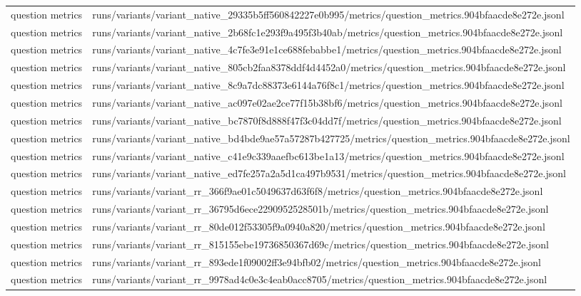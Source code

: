 \begin{tabular}{ll}
question metrics & runs/variants/variant_native_29335b5ff560842227e0b995/metrics/question_metrics.904bfaacde8e272e.jsonl \\
question metrics & runs/variants/variant_native_2b68fc1e293f9a495f3b40ab/metrics/question_metrics.904bfaacde8e272e.jsonl \\
question metrics & runs/variants/variant_native_4c7fe3e91e1ce688febabbe1/metrics/question_metrics.904bfaacde8e272e.jsonl \\
question metrics & runs/variants/variant_native_805cb2faa8378ddf4d4452a0/metrics/question_metrics.904bfaacde8e272e.jsonl \\
question metrics & runs/variants/variant_native_8c9a7dc88373e6144a76f8c1/metrics/question_metrics.904bfaacde8e272e.jsonl \\
question metrics & runs/variants/variant_native_ac097e02ae2ce77f15b38bf6/metrics/question_metrics.904bfaacde8e272e.jsonl \\
question metrics & runs/variants/variant_native_bc7870f8d888f47f3c04dd7f/metrics/question_metrics.904bfaacde8e272e.jsonl \\
question metrics & runs/variants/variant_native_bd4bde9ae57a57287b427725/metrics/question_metrics.904bfaacde8e272e.jsonl \\
question metrics & runs/variants/variant_native_c41e9c339aaefbc613be1a13/metrics/question_metrics.904bfaacde8e272e.jsonl \\
question metrics & runs/variants/variant_native_ed7fe257a2a5d1ca497b9531/metrics/question_metrics.904bfaacde8e272e.jsonl \\
question metrics & runs/variants/variant_rr_366f9ae01c5049637d63f6f8/metrics/question_metrics.904bfaacde8e272e.jsonl \\
question metrics & runs/variants/variant_rr_36795d6ece2290952528501b/metrics/question_metrics.904bfaacde8e272e.jsonl \\
question metrics & runs/variants/variant_rr_80de012f53305f9a0940a820/metrics/question_metrics.904bfaacde8e272e.jsonl \\
question metrics & runs/variants/variant_rr_815155ebe19736850367d69c/metrics/question_metrics.904bfaacde8e272e.jsonl \\
question metrics & runs/variants/variant_rr_893ede1f09002ff3e94bfb02/metrics/question_metrics.904bfaacde8e272e.jsonl \\
question metrics & runs/variants/variant_rr_9978ad4c0e3c4eab0acc8705/metrics/question_metrics.904bfaacde8e272e.jsonl \\

\end{tabular}
